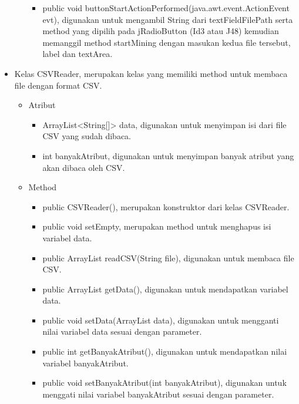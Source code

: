 \begin{itemize}
\begin{itemize}
\begin{itemize}
			\item public void buttonStartActionPerformed(java.awt.event.ActionEvent evt), digunakan untuk mengambil String dari textFieldFilePath serta method yang dipilih pada jRadioButton (Id3 atau J48) kemudian memanggil method startMining dengan masukan kedua file tersebut, label dan textArea.
		\end{itemize}
	\end{itemize}

	\item Kelas CSVReader, merupakan kelas yang memiliki method untuk membaca file dengan format CSV.
	\begin{itemize}
		\item Atribut
		\begin{itemize}
			\item ArrayList<String[]> data, digunakan untuk menyimpan isi dari file CSV yang sudah dibaca.
			\item int banyakAtribut, digunakan untuk menyimpan banyak atribut yang akan dibaca oleh CSV.
		\end{itemize}
		\item Method
		\begin{itemize}
			\item public CSVReader(), merupakan konstruktor dari kelas CSVReader.
			\item public void setEmpty, merupakan method untuk menghapus isi variabel data.
			\item public ArrayList readCSV(String file), digunakan untuk membaca file CSV.
			\item public ArrayList getData(), digunakan untuk mendapatkan variabel data.
			\item public void setData(ArrayList data), digunakan untuk mengganti nilai variabel data sesuai dengan parameter.
			\item public int getBanyakAtribut(), digunakan untuk mendapatkan nilai variabel banyakAtribut.
			\item public void setBanyakAtribut(int banyakAtribut), digunakan untuk menggati nilai variabel banyakAtribut sesuai dengan parameter.
		\end{itemize}
	\end{itemize}


\end{itemize}
